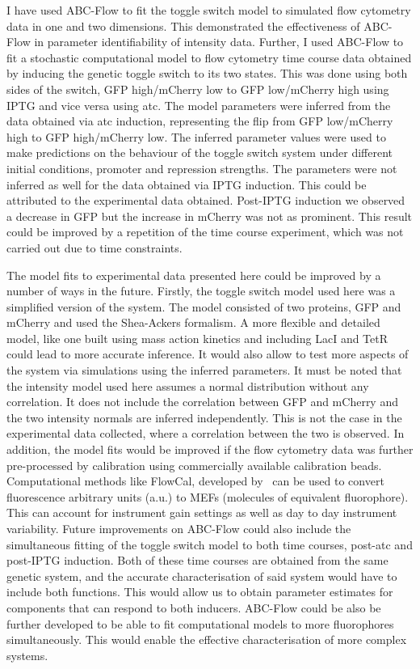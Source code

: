 I have used ABC-Flow to fit the toggle switch model to simulated flow cytometry data in one and two dimensions. This demonstrated the effectiveness of ABC-Flow in parameter identifiability of intensity data. Further, I used ABC-Flow to fit a stochastic computational model to flow cytometry time course data obtained by inducing the genetic toggle switch to its two states. This was done using both sides of the switch, GFP high/mCherry low to GFP low/mCherry high using IPTG and vice versa using \acrshort{atc}. The model parameters were inferred from the data obtained via \acrshort{atc} induction, representing the flip from GFP low/mCherry high to GFP high/mCherry low. The inferred parameter values were used to make predictions on the behaviour of the toggle switch system under different initial conditions, promoter and repression strengths. The parameters were not inferred as well for the data obtained via IPTG induction. This could be attributed to the experimental data obtained. Post-IPTG induction we observed a decrease in GFP but the increase in mCherry was not as prominent. This result could be improved by a repetition of the time course experiment, which was not carried out due to time constraints.


The model fits to experimental data presented here could be improved by a number of ways in the future. Firstly, the toggle switch model used here was a simplified version of the system. The model consisted of two proteins, GFP and mCherry and used the Shea-Ackers formalism. A more flexible and detailed model, like one built using mass action kinetics and including LacI and TetR could lead to more accurate inference. It would also allow to test more aspects of the system via simulations using the inferred parameters. It must  be noted that the intensity model used here assumes a normal distribution without any correlation. It does not include the correlation between GFP and mCherry and the two intensity normals are inferred independently. This is not the case in the experimental data collected, where a correlation between the two is observed. In addition, the model fits would be improved if the flow cytometry data was further pre-processed by calibration using commercially available calibration beads. Computational methods like FlowCal, developed by~\textcite{Tabor:2009bz} can be used to convert fluorescence arbitrary units (a.u.) to MEFs (molecules of equivalent fluorophore). This can account for instrument gain settings as well as day to day instrument variability. Future improvements on ABC-Flow could also include the simultaneous fitting of the toggle switch model to both time courses, post-\acrshort{atc} and post-IPTG induction. Both of these time courses are obtained from the same genetic system, and the accurate characterisation of said system would have to include both functions. This would allow us to obtain parameter estimates for components that can respond to both inducers. ABC-Flow could be also be further developed to be able to fit computational models to more fluorophores simultaneously. This would enable the effective characterisation of more complex systems.



